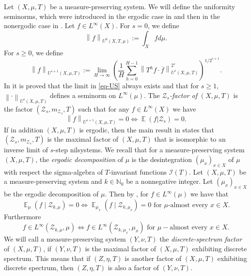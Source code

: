 \documentclass[letter, 11pt]{article}
\theoremstyle{definition}
\theoremstyle{plain}
\newcommand{\N}{\mathbb{N}}
\newcommand{\norm}[1]{\left\lVert#1\right\rVert}
\providecommand{\norm}[1]{\lVert #1\rVert}
\newcommand{\1}{\mathbbm{1}}
\newcommand{\E}{\operatorname{\mathbb{E}}}
\begin{document}
Let $(X,\mu,T)$ be a measure-preserving system. We will define the uniformity seminorms, which were introduced in the ergodic case in \cite{Host_Kra_nonconventional_averages_nilmanifolds:2005} and then in the nonergodic case in \cite{Chu_Frantzikinakis_Host11}. Let $f\in L^\infty(X)$. For $s=0$, we define
$$\norm{f}_{U^0(X,T,\mu)}:=\int_X f d\mu.$$
For $s\geq 0$, we define 
\begin{equation}\label{eq-US}
   \norm{f}_{U^{s+1}(X,\mu,T)}:=\lim_{H\to \infty} \left( \frac{1}{H}\sum_{h=0}^{H-1} \norm{T^h f \cdot \overline{f}}_{U^{s}(X,\mu,T)}^{2^s} \right)^{1/2^{s+1}}. 
\end{equation}
In \cite{Host_Kra_nonconventional_averages_nilmanifolds:2005} it is proved that the limit in \cref{eq-US} always exists and that for $s\geq 1$, $\norm{\cdot}_{U^s(X,\mu,T)}$ defines a seminorm on $L^\infty(\mu)$. The \textit{$\mathcal{Z}_s$-factor of} $(X,\mu,T)$ is the factor $(\mathcal{Z}_s,m_{\mathcal{Z}_s},T)$ such that for any $f\in L^\infty(X)$ we have 
$$\norm{f}_{U^{s+1}(X,\mu,T)}=0 \iff \E(f |\mathcal{Z}_s)=0. $$
If in addition $(X,\mu,T)$ is ergodic, then the main result in \cite{Host_Kra_nonconventional_averages_nilmanifolds:2005} states that $(\mathcal{Z}_s,m_{\mathcal{Z}_s},T)$ is the maximal factor of $(X,\mu,T)$ that is isomorphic to an inverse limit of $s$-step nilsystems. We recall that for a measure-preserving system $(X,\mu,T)$, the \textit{ergodic decomposition} of $\mu$ is the desintegration $(\mu_x)_{x\in X}$ of $\mu$ with respect the sigma-algebra of $T$-invariant functions $\mathcal{I}(T)$. Let $(X,\mu,T)$ be a measure-preserving system and $k\in \N_0$ be a nonnegative integer. Let $(\mu_x)_{x\in X}$ be the ergodic decomposition of $\mu$. Then by \cite[Corollary 3.3]{Chu_Frantzikinakis_Host11}, for $f\in L^\infty(\mu)$ we have that 
    $$\E_\mu(f \mid \mathcal{Z}_{k,\mu})=0 \iff \E_{\mu_x}(f \mid \mathcal{Z}_{k,\mu_x})=0 \text{ for } \mu\text{-almost every } x\in X.$$
    Furthermore
    \begin{equation}\label{prop-CFH}
        f\in L^\infty(\mathcal{Z}_{k,\mu},\mu) \iff f\in L^\infty(\mathcal{Z}_{k,\mu_x},\mu_x) \text{ for }\mu-\text{almost every } x\in X.
    \end{equation}
We will call a measure-preserving system $(Y,\nu,T)$ the \textit{discrete-spectrum factor} of $(X,\mu,T)$, if $(Y,\nu,T)$ is the maximal factor of $(X,\mu,T)$ exhibiting discrete spectrum. This means that if $(Z,\eta,T)$ is another factor of $(X,\mu,T)$ exhibiting discrete spectrum, then $(Z,\eta,T)$ is also a factor of $(Y,\nu,T)$.
\end{document}
